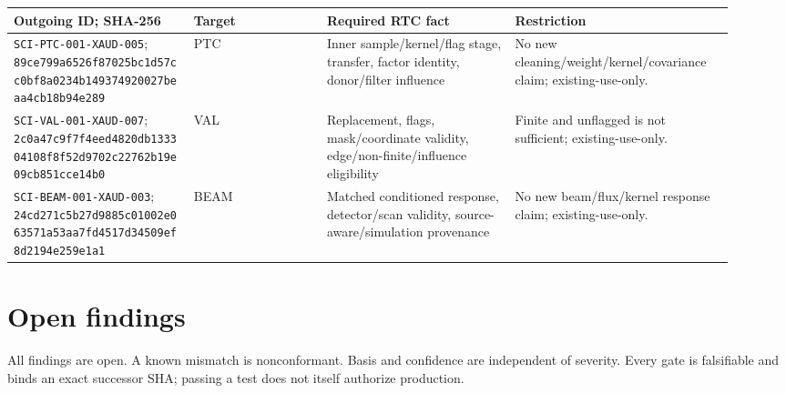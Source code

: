 \documentclass[11pt]{article}
\newcommand{\code}[1]{\nolinkurl{#1}}
\begin{document}
\begin{longtable}{@{}L{0.23\linewidth}L{0.17\linewidth}L{0.24\linewidth}L{0.28\linewidth}@{}}
\toprule
Outgoing ID; SHA-256 & Target & Required RTC fact & Restriction \\
\midrule
\endhead
\code{SCI-PTC-001-XAUD-005}; \code{89ce799a6526f87025bc1d57cc0bf8a0234b149374920027beaa4cb18b94e289} & PTC & Inner sample/kernel/flag stage, transfer, factor identity, donor/filter influence & No new cleaning/weight/kernel/covariance claim; existing-use-only. \\
\code{SCI-VAL-001-XAUD-007}; \code{2c0a47c9f7f4eed4820db133304108f8f52d9702c22762b19e09cb851cce14b0} & VAL & Replacement, flags, mask/coordinate validity, edge/non-finite/influence eligibility & Finite and unflagged is not sufficient; existing-use-only. \\
\code{SCI-BEAM-001-XAUD-003}; \code{24cd271c5b27d9885c01002e063571a53aa7fd4517d34509ef8d2194e259e1a1} & BEAM & Matched conditioned response, detector/scan validity, source-aware/simulation provenance & No new beam/flux/kernel response claim; existing-use-only. \\
\bottomrule
\end{longtable}

\section{Open findings}

All findings are open.  A known mismatch is nonconformant.  Basis and
confidence are independent of severity.  Every gate is falsifiable and binds
an exact successor SHA; passing a test does not itself authorize production.
\end{document}
